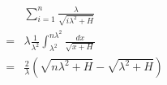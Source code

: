 \documentclass{article}
\begin{document}
\begin{eqnarray}
&&\sum_{i=1}^{n}\frac{\lambda}{\sqrt{i\lambda^2+H}}\\
&=&\lambda\frac{1}{\lambda^2}\int_{\lambda^2}^{n\lambda^2}\frac{dx}{\sqrt{x+H}}\\
&=&\frac{2}{\lambda}(\sqrt{n\lambda^2+H}-\sqrt{\lambda^2+H})
\end{eqnarray}
\end{document}
